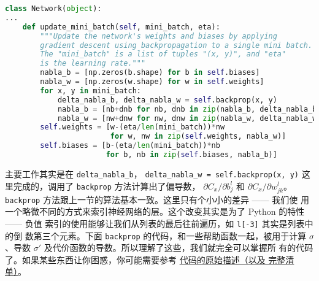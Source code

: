 \begin{lstlisting}[language=Python]
class Network(object):
...
    def update_mini_batch(self, mini_batch, eta):
        """Update the network's weights and biases by applying
        gradient descent using backpropagation to a single mini batch.
        The "mini_batch" is a list of tuples "(x, y)", and "eta"
        is the learning rate."""
        nabla_b = [np.zeros(b.shape) for b in self.biases]
        nabla_w = [np.zeros(w.shape) for w in self.weights]
        for x, y in mini_batch:
            delta_nabla_b, delta_nabla_w = self.backprop(x, y)
            nabla_b = [nb+dnb for nb, dnb in zip(nabla_b, delta_nabla_b)]
            nabla_w = [nw+dnw for nw, dnw in zip(nabla_w, delta_nabla_w)]
        self.weights = [w-(eta/len(mini_batch))*nw
                        for w, nw in zip(self.weights, nabla_w)]
        self.biases = [b-(eta/len(mini_batch))*nb
                       for b, nb in zip(self.biases, nabla_b)]
\end{lstlisting}

主要工作其实是在 \lstinline!delta_nabla_b!，%
\lstinline!delta_nabla_w = self.backprop(x, y)! 这里完成的，调用了
\lstinline!backprop! 方法计算出了偏导数，
$\partial C_x/\partial b_j^l$ 和 $\partial C_x/\partial w_{jk}^l$。
\lstinline!backprop! 方法跟上一节的算法基本一致。这里只有个小小的差异 —— 我们使
用一个略微不同的方式来索引神经网络的层。这个改变其实是为了 Python 的特性 —— 负值
索引的使用能够让我们从列表的最后往前遍历，如 \lstinline!l[-3]!  其实是列表中的倒
数第三个元素。下面 \lstinline!backprop! 的代码，和一些帮助函数一起，被用于计算
$\sigma$、导数 $\sigma'$ 及代价函数的导数。所以理解了这些，我们就完全可以掌握所
有的代码了。如果某些东西让你困惑，你可能需要参考%
\hyperref[sec:implementing_our_network_to_classify_digits]{代码的原始描述（以及
    完整清单）}。


